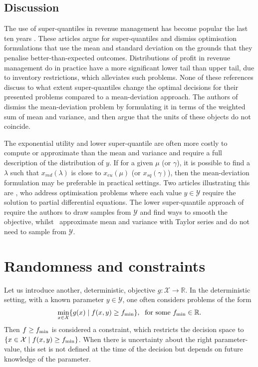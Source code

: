 \documentclass[main.tex]{subfiles}
\begin{document}
\subsection{Discussion}
The use of super-quantiles in revenue management has become popular
the last ten years
\citep{wu2014risk,xue2015optimal,zhou2008optimal,ahmed2007coherent}.
These articles argue for super-quantiles and dismiss
optimisation formulations that use the mean and standard deviation
on the grounds that they penalise better-than-expected outcomes.
Distributions of profit in revenue management do in practice
have a more significant lower tail than upper tail, due to inventory
restrictions, which alleviates such problems.
None of these references discuss to what extent super-quantiles change the
optimal decisions for their presented problems compared to a
mean-deviation approach.
The authors of \citep{choi2011multiproduct}
dismiss the mean-deviation
problem by formulating it in terms of the weighted sum of mean and
variance, and then argue that the units of these objects do not
coincide.

The exponential utility and lower super-quantile are often more costly
to compute or approximate than the mean and variance and require a
full description of the distribution of $y$. If for a given $\mu$ (or
$\gamma$), it is possible to find a $\lambda$ such that
$x_{md}(\lambda)$ is close to $x_{eu}(\mu)$ (or $x_{sq}(\gamma)$), then the
mean-deviation formulation may be preferable in practical settings.
Two articles illustrating this are
\citep{kouri2016risk,alexanderian2017mean}, who address optimisation problems
where each value $y\in\mathcal{Y}$ require the solution to partial
differential equations.
The lower super-quantile approach of~\cite{kouri2016risk}
require the authors to draw samples from $\mathcal{Y}$ and find ways to smooth the objective,
whilst~\cite{alexanderian2017mean} approximate mean and variance
with Taylor series and do not need to sample from $\mathcal{Y}$.


\section{Randomness and constraints}\label{sec:one_randomness_constraints}
Let us introduce another, deterministic, objective $g:\mathcal
X\to\mathbb{R}$. In the deterministic setting, with a known parameter
$y\in\mathcal{Y}$, one often considers problems of the form
\begin{align}
  \min_{x\in\mathcal{X}}\{g(x)\mid f(x,y)\geq f_{\textnormal{min}} \},\;
  \text{ for some } f_{\textnormal{min}}\in\mathbb{R}.
\end{align}
Then $f\geq f_{\textnormal{min}}$ is considered a constraint, which restricts the
decision space to $\{x\in\mathcal{X}\mid f(x,y)\geq f_{\textnormal{min}}\}$.
When there is uncertainty about the right parameter-value, this set is
not defined at the time of the decision but depends on future knowledge
of the parameter.
\end{document}
